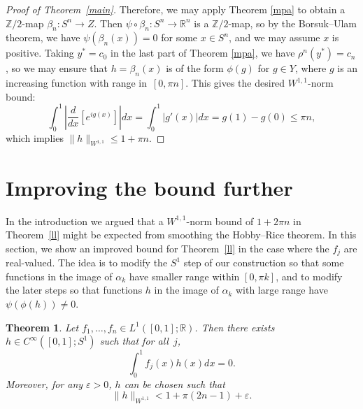 \documentclass[11pt, reqno, english]{amsart}
\theoremstyle{plain}
\newtheorem{theorem}{Theorem}[section]
\theoremstyle{definition}
\newcommand{\R}{\mathbb{R}}
\newcommand{\Z}{\mathbb{Z}}
\begin{document}
\begin{proof}[Proof of Theorem~\ref{main}]
  Therefore, we may apply Theorem \ref{mpa} to obtain a $\Z/2$-map
  $\beta_{n}\colon S^{n} \rightarrow Z$. Then $\psi \circ \beta_{n}\colon S^{n}
  \rightarrow \R^{n}$ is a $\Z/2$-map, so by the Borsuk--Ulam theorem, we have
  $\psi(\beta_{n}(x)) = 0$ for some $x \in S^{n}$, and we may assume $x$ is
  positive. Taking $y^{*} = c_{0}$ in the last part of Theorem \ref{mpa}, we
  have $\rho^{n}(y^{*}) = c_{n}$, so we may ensure that $h = \beta_{n}(x)$ is
  of the form $\phi(g)$ for $g \in Y$, where $g$ is an increasing function with
  range in~$[0, \pi n]$. This gives the desired $W^{1, 1}$-norm bound:
  $$\int_{0}^{1}\left|\frac{d}{dx}[e^{ig(x)}]\right|dx = \int_{0}^{1}|g'(x)|dx =
  g(1) - g(0) \le \pi n,$$
  which implies $\|h\|_{W^{1, 1}} \le 1 + \pi n$.
\end{proof}
















\section{Improving the bound further}

In the introduction we argued that a $W^{1,1}$-norm bound of $1+2\pi n$ in Theorem~\ref{ll}
might be expected from smoothing the Hobby--Rice theorem.
In this section, we show an improved bound for Theorem~\ref{ll} in
the case where the $f_{j}$ are real-valued. The idea is to modify the $S^{1}$
step of our construction so that some functions in the image of $\alpha_{k}$
have smaller range within $[0, \pi k]$, and to modify the later steps so that
functions $h$ in the image of $\alpha_{k}$ with large range have $\psi(\phi(h))
\ne 0$.

\begin{theorem}
  Let $f_{1}, \ldots , f_{n} \in L^{1}([0, 1]; \mathbb{R})$. Then there exists
  $h \in C^{\infty}([0, 1]; S^{1})$ such that for all~$j$,
  $$\int_{0}^{1}f_{j}(x)h(x)dx = 0.$$
  Moreover, for any $\varepsilon > 0$, $h$ can be chosen such that
  $$\|h\|_{W^{1,1}} < 1 + \pi(2n - 1) + \varepsilon.$$
\end{theorem}
\end{document}
